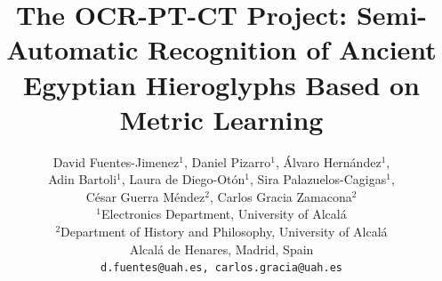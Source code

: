 \documentclass[10pt,onecolumn,letterpaper]{article}
\begin{document}
	\title{The OCR-PT-CT Project: Semi-Automatic Recognition of Ancient Egyptian Hieroglyphs Based on Metric Learning}
	
	\author{
		David Fuentes-Jimenez$^{1}$,
		Daniel Pizarro$^{1}$,
		Álvaro Hernández$^{1}$,\\
		Adin Bartoli$^{1}$,
		Laura de Diego-Otón$^{1}$,
		Sira Palazuelos-Cagigas$^{1}$,\\
		César Guerra Méndez$^{2}$,
		Carlos Gracia Zamacona$^{2}$\\[1ex]
		$^{1}$Electronics Department, University of Alcalá\\
		$^{2}$Department of History and Philosophy, University of Alcalá\\
		Alcalá de Henares, Madrid, Spain\\
		{\tt\small d.fuentes@uah.es, carlos.gracia@uah.es}
	}
	
\end{document}

